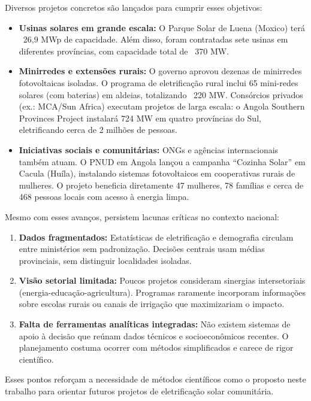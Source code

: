 \documentclass[12pt, a4paper]{article}
\begin{document}
Diversos projetos concretos são lançados para cumprir esses objetivos:

\begin{itemize}
\item \textbf{Usinas solares em grande escala:} O Parque Solar de Luena (Moxico) terá ~26,9 MWp de capacidade. Além disso, foram contratadas sete usinas em diferentes províncias, com capacidade total de ~370 MW.
\item \textbf{Minirredes e extensões rurais:} O governo aprovou dezenas de minirredes fotovoltaicas isoladas. O programa de eletrificação rural inclui 65 mini-redes solares (com baterias) em aldeias, totalizando ~220 MW. Consórcios privados (ex.: MCA/Sun Africa) executam projetos de larga escala: o Angola Southern Provinces Project instalará 724 MW em quatro províncias do Sul, eletrificando cerca de 2 milhões de pessoas.
\item \textbf{Iniciativas sociais e comunitárias:} ONGs e agências internacionais também atuam. O PNUD em Angola lançou a campanha ``Cozinha Solar'' em Cacula (Huíla), instalando sistemas fotovoltaicos em cooperativas rurais de mulheres. O projeto beneficia diretamente 47 mulheres, 78 famílias e cerca de 468 pessoas locais com acesso à energia limpa.
\end{itemize}

Mesmo com esses avanços, persistem lacunas críticas no contexto nacional:

\begin{enumerate}
\item \textbf{Dados fragmentados:} Estatísticas de eletrificação e demografia circulam entre ministérios sem padronização. Decisões centrais usam médias provinciais, sem distinguir localidades isoladas.
\item \textbf{Visão setorial limitada:} Poucos projetos consideram sinergias intersetoriais (energia-educação-agricultura). Programas raramente incorporam informações sobre escolas rurais ou canais de irrigação que maximizariam o impacto.
\item \textbf{Falta de ferramentas analíticas integradas:} Não existem sistemas de apoio à decisão que reúnam dados técnicos e socioeconômicos recentes. O planejamento costuma ocorrer com métodos simplificados e carece de rigor científico.
\end{enumerate}

Esses pontos reforçam a necessidade de métodos científicos como o proposto neste trabalho para orientar futuros projetos de eletrificação solar comunitária.
\end{document}
